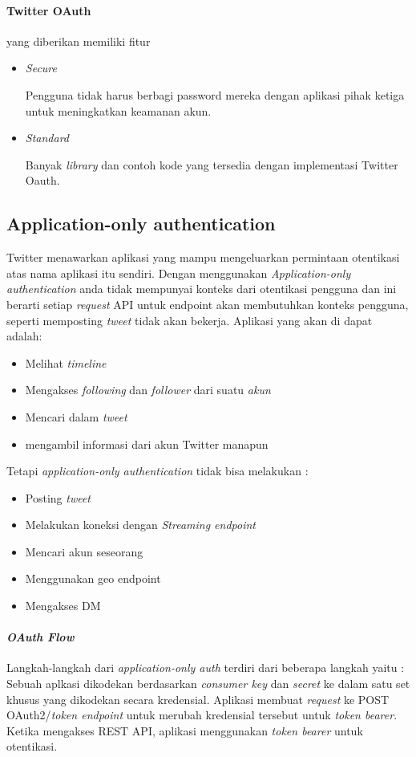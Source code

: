 \paragraph{Twitter OAuth}yang diberikan memiliki fitur
\begin{itemize}
	\item \textit{Secure}
	
	Pengguna tidak harus berbagi password mereka dengan aplikasi pihak ketiga untuk meningkatkan keamanan akun.
	\item \textit{Standard}
	
	Banyak \textit{library} dan contoh kode yang tersedia dengan implementasi Twitter Oauth.
\end{itemize}

\subsection{Application-only authentication}
Twitter menawarkan aplikasi yang mampu mengeluarkan permintaan otentikasi atas nama aplikasi itu sendiri. Dengan menggunakan \textit{Application-only authentication} anda tidak mempunyai konteks dari otentikasi pengguna dan ini berarti setiap \textit{request} API untuk endpoint akan membutuhkan konteks pengguna, seperti memposting \textit{tweet} tidak akan bekerja. Aplikasi yang akan di dapat adalah: 

\begin{itemize}
	\item Melihat \textit{timeline}
	\item Mengakses \textit{following} dan \textit{follower} dari suatu \textit{akun}
	\item Mencari dalam \textit{tweet}
	\item mengambil informasi dari akun Twitter manapun
\end{itemize}


Tetapi \textit{application-only authentication} tidak bisa melakukan :

\begin{itemize}
	\item Posting \textit{tweet}
	\item Melakukan koneksi dengan \textit{Streaming endpoint}
	\item Mencari akun seseorang
	\item Menggunakan geo endpoint
	\item Mengakses DM
\end{itemize}

\paragraph{\textit{OAuth Flow}}
Langkah-langkah dari \textit{application-only auth} terdiri dari beberapa langkah yaitu :
Sebuah aplkasi dikodekan berdasarkan \textit{consumer key} dan \textit{secret} ke dalam satu set khusus yang dikodekan secara kredensial.
Aplikasi membuat \textit{request} ke POST OAuth2/\textit{token endpoint} untuk merubah kredensial tersebut untuk \textit{token bearer}.
Ketika mengakses REST API, aplikasi menggunakan \textit{token bearer} untuk otentikasi.

